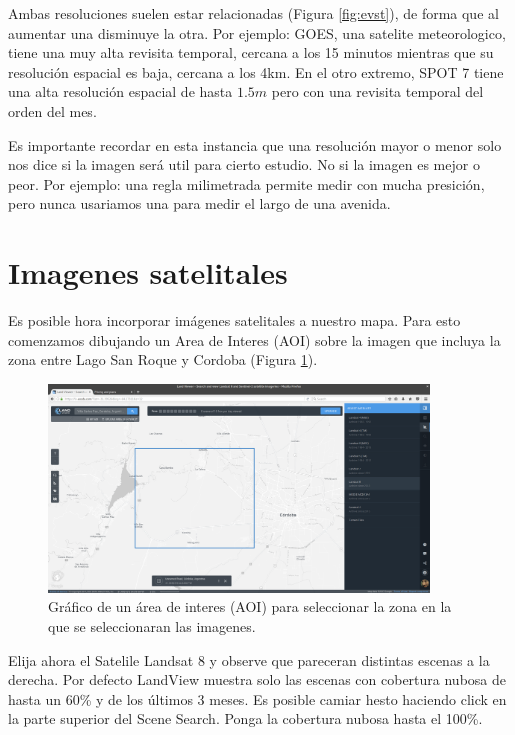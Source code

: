 \documentclass[a4paper,12pt]{book}
\begin{document}
Ambas resoluciones suelen estar relacionadas (Figura \ref{fig:evst}), de forma que al aumentar una disminuye la otra. Por ejemplo: GOES, una satelite meteorologico, tiene una muy alta revisita temporal, cercana a los 15 minutos mientras que su resolución espacial es baja, cercana a los 4km. En el otro extremo, SPOT 7 tiene una alta resolución espacial de hasta $1.5m$ pero con una revisita temporal del orden del mes.

Es importante recordar en esta instancia que una resolución mayor o menor solo nos dice si la imagen será util para cierto estudio. No si la imagen es mejor o peor. Por ejemplo: una regla milimetrada permite medir con mucha presición, pero nunca usariamos una para medir el largo de una avenida.


\section{Imagenes satelitales}
Es posible hora incorporar imágenes satelitales a nuestro mapa. Para esto comenzamos dibujando un Area de Interes (AOI) sobre la imagen que incluya la zona entre Lago San Roque y Cordoba (Figura \ref{fig:aoi}).

\begin{figure}[h!]
    \centering
    \includegraphics[width=0.9\textwidth]{fig:aoi.png}
    \caption{Gráfico de un área de interes (AOI) para seleccionar la zona en la que se seleccionaran las imagenes.}
    \label{fig:aoi}
\end{figure}

Elija ahora el Satelile Landsat 8 y observe que pareceran distintas escenas a la derecha. Por defecto LandView muestra solo las escenas con cobertura nubosa de hasta un 60\% y de los últimos 3 meses. Es posible camiar hesto haciendo click en la parte superior del Scene Search.  Ponga la cobertura nubosa hasta el 100\%.
\end{document}
